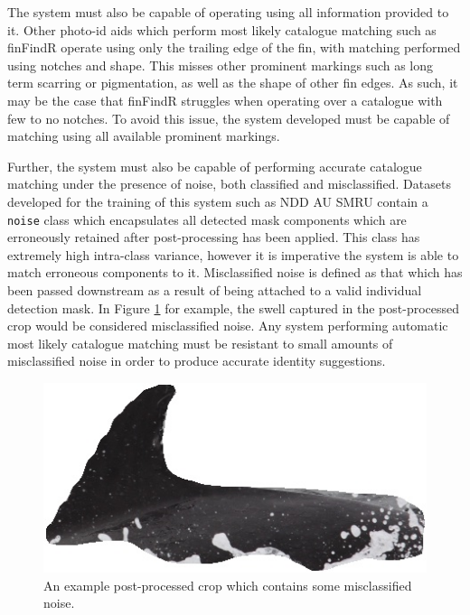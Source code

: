 The system must also be capable of operating using all information provided to it. Other photo-id aids which perform most likely catalogue matching such as finFindR \cite{thompson_finfindr_2022} operate using only the trailing edge of the fin, with matching performed using notches and shape. This misses other prominent markings such as long term scarring or pigmentation, as well as the shape of other fin edges. As such, it may be the case that finFindR struggles when operating over a catalogue with few to no notches. To avoid this issue, the system developed must be capable of matching using all available prominent markings. 

Further, the system must also be capable of performing accurate catalogue matching under the presence of noise, both classified and misclassified. Datasets developed for the training of this system such as NDD AU SMRU contain a \texttt{noise} class which encapsulates all detected mask components which are erroneously retained after post-processing has been applied. This class has extremely high intra-class variance, however it is imperative the system is able to match erroneous components to it. Misclassified noise is defined as that which has been passed downstream as a result of being attached to a valid individual detection mask. In Figure \ref{fig:crop-with-unclassified-noise} for example, the swell captured in the post-processed crop would be considered misclassified noise. Any system performing automatic most likely catalogue matching must be resistant to small amounts of misclassified noise in order to produce accurate identity suggestions.

\begin{figure}
	\begin{center}
		\includegraphics[scale=0.6]{Chapter5/figs/crop-with-unclassified-noise.jpg}
	\end{center}
	\caption{An example post-processed crop which contains some misclassified noise.}
	\label{fig:crop-with-unclassified-noise}
\end{figure}


